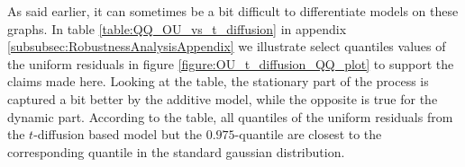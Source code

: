 As said earlier, it can sometimes be a bit difficult to differentiate models on these graphs. In table \ref{table:QQ_OU_vs_t_diffusion} in appendix \ref{subsubsec:RobustnessAnalysisAppendix} we illustrate select quantiles values of the uniform residuals in figure \ref{figure:OU_t_diffusion_QQ_plot} to support the claims made here. Looking at the table, the stationary part of the process is captured a bit better by the additive model, while the opposite is true for the dynamic part. According to the table, all quantiles of the uniform residuals from the $t$-diffusion based model but the $0.975$-quantile are closest to the corresponding quantile in the standard gaussian distribution.

